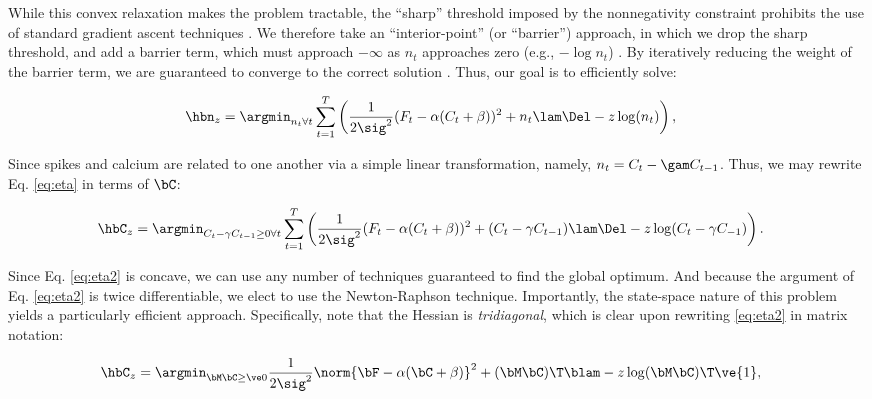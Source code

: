 While this convex relaxation makes the problem tractable, the ``sharp'' threshold imposed by the nonnegativity constraint prohibits the use of standard gradient ascent techniques \cite{BoydVandenberghe04}. We therefore take an ``interior-point'' (or ``barrier'') approach, in which we drop the sharp threshold, and add a barrier term, which must approach $-\infty$ as $n_t$ approaches zero (e.g., $-\log n_t$) \cite{BoydVandenberghe04}.  By iteratively reducing the weight of the barrier term, we are guaranteed to converge to the correct solution \cite{BoydVandenberghe04}.  Thus, our goal is to efficiently solve:


\begin{align} \label{eq:eta}
\hbn_{\zzz} &= \argmin_{n_t \forall t}  \sum_{t=1}^T \left( \frac{1}{2 \sig^2}(F_t - \alpha(C_t + \beta))^2  +  n_t  \lam \Del - \zzz \log(n_t) \right),
\end{align}

Since spikes and calcium are related to one another via a simple linear transformation, namely, $n_t=C_t - \gam C_{t-1}$.  Thus, we may rewrite Eq. \eqref{eq:eta} in terms of $\bC$:

\begin{align} 
\hbC_{\zzz} &= \argmin_{C_t - \gamma C_{t-1} \geq 0 \forall t} \sum_{t=1}^{T} \left( \frac{1}{2 \sig^2} (F_t -\alpha (C_t + \beta))^2  + (C_t - \gamma C_{t-1}) \lam \Del - \zzz \log(C_t - \gamma C_{-1}) \right). \label{eq:eta2}
\end{align}

\noindent Since Eq. \eqref{eq:eta2} is concave, we can use any number of techniques guaranteed to find the global optimum.  And because the argument of Eq. \eqref{eq:eta2} is twice differentiable, we elect to use the Newton-Raphson technique. Importantly, the state-space nature of this problem yields a particularly efficient approach. Specifically, note that the Hessian is \emph{tridiagonal}, which is clear upon rewriting \eqref{eq:eta2} in matrix notation:

\begin{align} 
\hbC_{\zzz} %
&= \az  \frac{1}{2 \sig^2} \norm{\bF - \alpha (\bC +\beta)}^2 + (\bM \bC )\T \blam  - \zzz \log(\bM \bC)\T\ve{1},  \label{eq:eta3}
\end{align}

